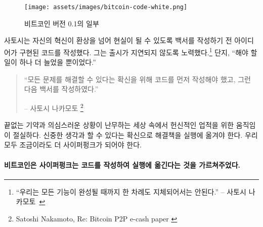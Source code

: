 \begin{figure}
	\texttt{[image: assets/images/bitcoin-code-white.png]}
	\caption{비트코인 버전 0.1의 일부}
	\label{fig:bitcoin-code-white}
\end{figure}

\begin{comment}
	To make sure that his innovation transcends fantasy and becomes reality, Satoshi
	wrote code to implement his idea before he wrote the whitepaper. He also made
	sure not to delay\footnote{\enquote{We shouldn't delay forever until every possible
			feature is done.} -- Satoshi Nakamoto~\cite{satoshi-delay}} any release forever.
	After all, \enquote{there's always going to be one more thing to do.}
\end{comment}
사토시는 자신의 혁신이 환상을 넘어 현실이 될 수 있도록 백서를 작성하기 전 아이디어가 구현된 코드를 작성했다.
그는 출시가 지연되지 않도록 노력했다.\footnote{\enquote{우리는 모든 기능이 완성될 때까지 한 차례도 지체되어서는 안된다.} -- 사토시 나카모토~\cite{satoshi-delay}}
단지, \enquote{해야 할 일이 하나 더 늘었을 뿐이었다.}


\begin{quotation}\begin{samepage}
		\enquote{모든 문제를 해결할 수 있다는 확신을 위해 코드를 먼저 작성해야 했고, 그런 다음 백서를 작성하였다.}
		\begin{flushright} -- 사토시 나카모토 \footnote{Satoshi Nakamoto, Re: Bitcoin P2P e-cash paper \cite{satoshi-mail-code-first}}
\end{flushright}\end{samepage}\end{quotation}

\begin{comment}
	In today's world of endless promises and doubtful execution, an exercise
	in dedicated building was desperately needed. Be deliberate, convince
	yourself that you can actually solve the problems, and implement the
	solutions. We should all aim to be a bit more cypherpunk.
\end{comment}
끝없는 기약과 의심스러운 상황이 난무하는 세상 속에서 헌신적인 업적을 위한 움직임이 절실하다. 
신중한 생각과 할 수 있다는 확신으로 해결책을 실행에 옮겨야 한다. 우리 모두 조금이라도 더 사이퍼펑크가 되어야 한다.


\paragraph{비트코인은 사이퍼펑크는 코드를 작성하여 실행에 옮긴다는 것을 가르쳐주었다.}

